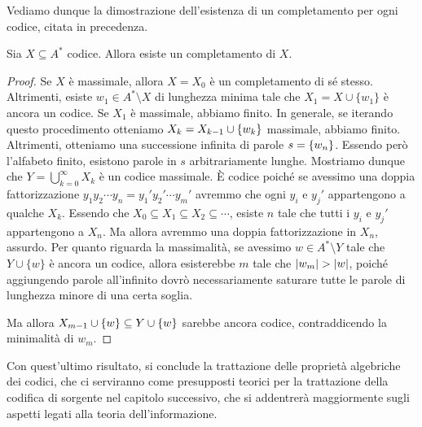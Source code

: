 Vediamo dunque la dimostrazione dell'esistenza di un completamento per ogni codice, citata in precedenza.
\begin{proposition}{}
  Sia \(X \subseteq A^*\) codice. Allora esiste un completamento di \(X\).
\end{proposition}
\begin{proof}
  Se \(X\) è massimale, allora \(X = X_0\) è un completamento di sé stesso.
  Altrimenti, esiste \(w_1 \in A^*\setminus X\) di lunghezza minima tale che \(X_1 = X \cup \{w_1\}\) è ancora un codice.
  Se \(X_1\) è massimale, abbiamo finito.
  In generale, se iterando questo procedimento otteniamo \(X_k = X_{k-1} \cup \set{w_k}\) massimale, abbiamo finito.
  Altrimenti, otteniamo una successione infinita di parole \(s = \set{w_n}\). Essendo però l'alfabeto finito, esistono parole in \(s\) arbitrariamente lunghe.
  Mostriamo dunque che \(Y = \bigcup_{k = 0}^{\infty} X_k\) è un codice massimale.
  È codice poiché se avessimo una doppia fattorizzazione \(y_1 y_2 \cdots y_n = y_1' y_2' \cdots y_m'\) avremmo che ogni \(y_i\) e \(y_j'\) appartengono a qualche \(X_k\). Essendo che \(X_0 \subseteq X_1 \subseteq X_2 \subseteq \cdots\), esiste \(n\) tale che tutti i \(y_i\) e \(y_j'\) appartengono a \(X_n\). Ma allora avremmo una doppia fattorizzazione in \(X_n\), assurdo.
  Per quanto riguarda la massimalità, se avessimo \(w \in A^* \setminus Y\) tale che \(Y \cup \{w\}\) è ancora un codice, allora esisterebbe \(m\) tale che \(\left|w_m\right| > \left|w\right|\), poiché aggiungendo parole all'infinito dovrò necessariamente saturare tutte le parole di lunghezza minore di una certa soglia.
  
  Ma allora \(X_{m-1} \cup \set{w}\subseteq Y \cup \set{w}\) sarebbe ancora codice, contraddicendo la minimalità di \(w_m\).
\end{proof}

Con quest'ultimo risultato, si conclude la trattazione delle proprietà algebriche dei codici, che ci serviranno come presupposti teorici per la trattazione della codifica di sorgente nel capitolo successivo, che si addentrerà maggiormente sugli aspetti legati alla teoria dell'informazione.